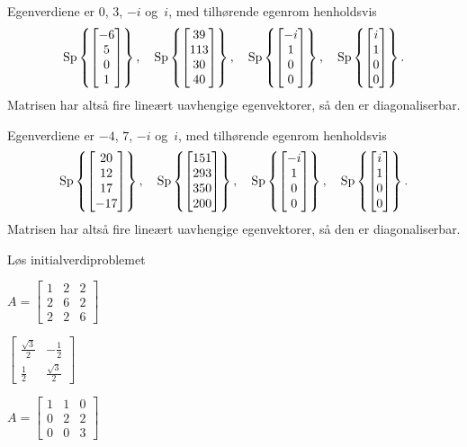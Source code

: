 \begin{losning}
\begin{punkt}
Egenverdiene er $0$, $3$, $-i$ og~$i$, med tilhørende egenrom
henholdsvis
\[
\operatorname{Sp} \left\{ \begin{bmatrix} -6 \\ 5 \\ 0 \\ 1 \end{bmatrix} \right\},\quad
\operatorname{Sp} \left\{ \begin{bmatrix} 39 \\ 113 \\ 30 \\ 40 \end{bmatrix} \right\},\quad
\operatorname{Sp} \left\{ \begin{bmatrix} -i \\ 1 \\ 0 \\ 0 \end{bmatrix} \right\},\quad
\operatorname{Sp} \left\{ \begin{bmatrix} i \\ 1 \\ 0 \\ 0 \end{bmatrix} \right\}.
\]
Matrisen har altså fire lineært uavhengige egenvektorer, så den er
diagonaliserbar.
\end{punkt}

\begin{punkt}
Egenverdiene er $-4$, $7$, $-i$ og~$i$, med tilhørende egenrom
henholdsvis
\[
\operatorname{Sp} \left\{ \begin{bmatrix} 20 \\ 12 \\ 17 \\ -17 \end{bmatrix} \right\},\quad
\operatorname{Sp} \left\{ \begin{bmatrix} 151 \\ 293 \\ 350 \\ 200 \end{bmatrix} \right\},\quad
\operatorname{Sp} \left\{ \begin{bmatrix} -i \\ 1 \\ 0 \\ 0 \end{bmatrix} \right\},\quad
\operatorname{Sp} \left\{ \begin{bmatrix} i \\ 1 \\ 0 \\ 0 \end{bmatrix} \right\}.
\]
Matrisen har altså fire lineært uavhengige egenvektorer, så den er
diagonaliserbar.
\end{punkt}
\end{losning}



\begin{oppgave}
Løs initialverdiproblemet
\begin{punkt}
$
A=
\begin{bmatrix}
1 & 2 & 2\\
2 & 6 & 2\\
2 & 2 & 6
\end{bmatrix}
$ 
\end{punkt}
\begin{punkt}
$\begin{bmatrix}
\frac{\sqrt{3}}{2} & -\frac{1}{2} \\ \frac{1}{2} & \frac{\sqrt{3}}{2}
\end{bmatrix}
$
\end{punkt}
\begin{punkt}
$
A =
\begin{bmatrix}
1 & 1 & 0 \\
0 & 2 & 2 \\
0 & 0 & 3
\end{bmatrix}
$
\end{punkt}


\end{oppgave}




